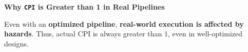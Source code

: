 \highspace
\begin{flushleft}
   \textcolor{Green3}{ \textbf{Why \texttt{CPI} is Greater than 1 in Real Pipelines}}
\end{flushleft}
Even with an \textbf{optimized pipeline}, \textbf{real-world execution is affected by hazards}. Thus, actual CPI is always greater than 1, even in well-optimized designs.
